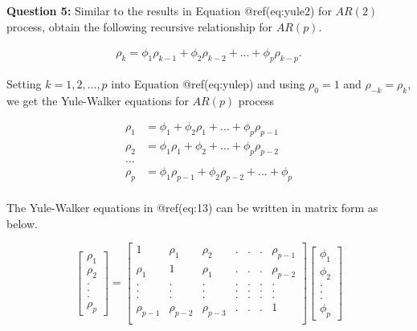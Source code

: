 \documentclass[
  11pt,
  a4paper,
]{report}
\begin{document}
\textbf{Question 5: } Similar to the results in Equation @ref(eq:yule2)
for \(AR(2)\) process, obtain the following recursive relationship for
\(AR(p)\).

\begin{align}
\rho_k = \phi_1\rho_{k-1}+\phi_2 \rho_{k-2} + ... + \phi_p \rho_{k-p}.
\end{align}

Setting \(k=1, 2, ..., p\) into Equation @ref(eq:yulep) and using
\(\rho_0=1\) and \(\rho_{-k}=\rho_k\), we get the Yule-Walker equations
for \(AR(p)\) process

\begin{equation}
\begin{aligned}
  \rho_1 &= \phi_1+\phi_2 \rho_{1} + ... + \phi_p \rho_{p-1}\\
  \rho_2 &= \phi_1 \rho_1+\phi_2  + ... + \phi_p \rho_{p-2}\\
  ... \\
  \rho_p &= \phi_1 \rho_{p-1} +\phi_2 \rho_{p-2}  + ... + \phi_p \\
\end{aligned}
\end{equation}

The Yule-Walker equations in @ref(eq:13) can be written in matrix form
as below.

\[\left[\begin{array}
{r}
\rho_1  \\
\rho_2  \\
.\\
.\\
.\\
\rho_p
\end{array}\right] = \left[\begin{array}
{rrrrrrr}
1 & \rho_1 & \rho_2 & .&.&.& \rho_{p-1} \\
\rho_1 & 1 & \rho_1 & .&.&.& \rho_{p-2} \\
. & . & . & .&.&.& . \\
. & . & . & .&.&.& . \\
. & . & . & .&.&.& . \\
\rho_{p-1} & \rho_{p-2} & \rho_{p-3} & .&.&.& 1 \\
\end{array}\right] \left[\begin{array}
{r}
\phi_1  \\
\phi_2  \\
.\\
.\\
.\\
\phi_p
\end{array}\right]
\]
\end{document}
